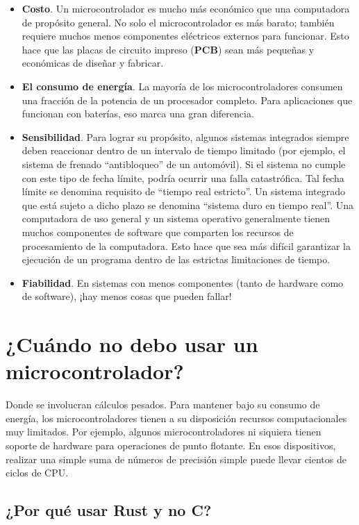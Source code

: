 \begin{itemize}
	\item \textbf{Costo}. Un microcontrolador es mucho más económico que una computadora de propósito general. No solo el microcontrolador es más barato; también requiere muchos menos componentes eléctricos externos para funcionar. Esto hace que las placas de circuito impreso (\textbf{PCB}) sean más pequeñas y económicas de diseñar y fabricar.
	\item \textbf{El consumo de energía}. La mayoría de los microcontroladores consumen una fracción de la potencia de un procesador completo. Para aplicaciones que funcionan con baterías, eso marca una gran diferencia.
	\item \textbf{Sensibilidad}. Para lograr su propósito, algunos sistemas integrados siempre deben reaccionar dentro de un intervalo de tiempo limitado (por ejemplo, el sistema de frenado ``antibloqueo'' de un automóvil). Si el sistema no cumple con este tipo de fecha límite, podría ocurrir una falla catastrófica. Tal fecha límite se denomina requisito de ``tiempo real estricto''. Un sistema integrado que está sujeto a dicho plazo se denomina ``sistema duro en tiempo real''. Una computadora de uso general y un sistema operativo generalmente tienen muchos componentes de software que comparten los recursos de procesamiento de la computadora. Esto hace que sea más difícil garantizar la ejecución de un programa dentro de las estrictas limitaciones de tiempo.
	\item \textbf{Fiabilidad}. En sistemas con menos componentes (tanto de hardware como de software), ¡hay menos cosas que pueden fallar!
\end{itemize}
\section{¿Cuándo no debo usar un microcontrolador?}

Donde se involucran cálculos pesados. Para mantener bajo su consumo de energía, los microcontroladores tienen a su disposición recursos computacionales muy limitados. Por ejemplo, algunos microcontroladores ni siquiera tienen soporte de hardware para operaciones de punto flotante. En esos dispositivos, realizar una simple suma de números de precisión simple puede llevar cientos de ciclos de CPU.

\subsection{¿Por qué usar Rust y no C?}


